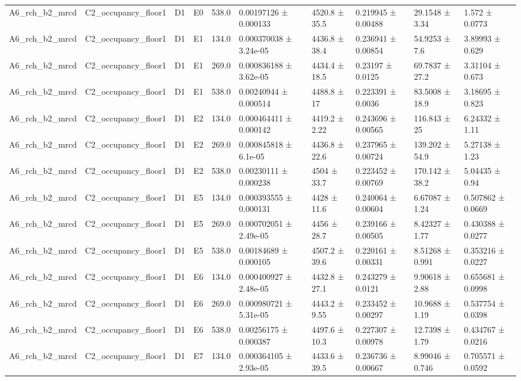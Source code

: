 \begin{table}
\begin{tabular}{llllllllll}
A6\_rch\_b2\_mrcd & C2\_occupancy\_floor1 & D1 & E0 & 538.0 & 0.00197126 ± 0.000133 & 4520.8 ± 35.5 & 0.219945 ± 0.00488 & 29.1548 ± 3.34 & 1.572 ± 0.0773 \\
A6\_rch\_b2\_mrcd & C2\_occupancy\_floor1 & D1 & E1 & 134.0 & 0.000370038 ± 3.24e-05 & 4436.8 ± 38.4 & 0.236941 ± 0.00854 & 54.9253 ± 7.6 & 3.89993 ± 0.629 \\
A6\_rch\_b2\_mrcd & C2\_occupancy\_floor1 & D1 & E1 & 269.0 & 0.000836188 ± 3.62e-05 & 4434.4 ± 18.5 & 0.23197 ± 0.0125 & 69.7837 ± 27.2 & 3.31104 ± 0.673 \\
A6\_rch\_b2\_mrcd & C2\_occupancy\_floor1 & D1 & E1 & 538.0 & 0.00240944 ± 0.000514 & 4488.8 ± 17 & 0.223391 ± 0.0036 & 83.5008 ± 18.9 & 3.18695 ± 0.823 \\
A6\_rch\_b2\_mrcd & C2\_occupancy\_floor1 & D1 & E2 & 134.0 & 0.000464411 ± 0.000142 & 4419.2 ± 2.22 & 0.243696 ± 0.00565 & 116.843 ± 25 & 6.24332 ± 1.11 \\
A6\_rch\_b2\_mrcd & C2\_occupancy\_floor1 & D1 & E2 & 269.0 & 0.000845818 ± 6.1e-05 & 4436.8 ± 22.6 & 0.237965 ± 0.00724 & 139.202 ± 54.9 & 5.27138 ± 1.23 \\
A6\_rch\_b2\_mrcd & C2\_occupancy\_floor1 & D1 & E2 & 538.0 & 0.00230111 ± 0.000238 & 4504 ± 33.7 & 0.223452 ± 0.00769 & 170.142 ± 38.2 & 5.04435 ± 0.94 \\
A6\_rch\_b2\_mrcd & C2\_occupancy\_floor1 & D1 & E5 & 134.0 & 0.000393555 ± 0.000131 & 4428 ± 11.6 & 0.240064 ± 0.00604 & 6.67087 ± 1.24 & 0.507862 ± 0.0669 \\
A6\_rch\_b2\_mrcd & C2\_occupancy\_floor1 & D1 & E5 & 269.0 & 0.000702051 ± 2.49e-05 & 4456 ± 28.7 & 0.239166 ± 0.00505 & 8.42327 ± 1.77 & 0.430388 ± 0.0277 \\
A6\_rch\_b2\_mrcd & C2\_occupancy\_floor1 & D1 & E5 & 538.0 & 0.00184689 ± 0.000105 & 4507.2 ± 39.6 & 0.220161 ± 0.00331 & 8.51268 ± 0.991 & 0.353216 ± 0.0227 \\
A6\_rch\_b2\_mrcd & C2\_occupancy\_floor1 & D1 & E6 & 134.0 & 0.000400927 ± 2.48e-05 & 4432.8 ± 27.1 & 0.243279 ± 0.0121 & 9.90618 ± 2.88 & 0.655681 ± 0.0998 \\
A6\_rch\_b2\_mrcd & C2\_occupancy\_floor1 & D1 & E6 & 269.0 & 0.000980721 ± 5.31e-05 & 4443.2 ± 9.55 & 0.233452 ± 0.00297 & 10.9688 ± 1.19 & 0.537754 ± 0.0398 \\
A6\_rch\_b2\_mrcd & C2\_occupancy\_floor1 & D1 & E6 & 538.0 & 0.00256175 ± 0.000387 & 4497.6 ± 10.3 & 0.227307 ± 0.00978 & 12.7398 ± 1.79 & 0.434767 ± 0.0216 \\
A6\_rch\_b2\_mrcd & C2\_occupancy\_floor1 & D1 & E7 & 134.0 & 0.000364105 ± 2.93e-05 & 4433.6 ± 39.5 & 0.236736 ± 0.00667 & 8.99046 ± 0.746 & 0.705571 ± 0.0592 \\

\end{tabular}
\end{table}
